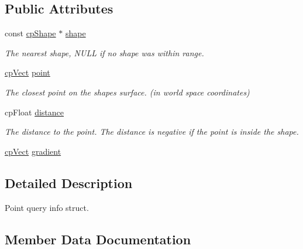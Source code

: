\subsection*{Public Attributes}
\begin{DoxyCompactItemize}
\item 
\mbox{\label{structcpPointQueryInfo_a98fddb05a4044f8a3e6b3da482ed06ed}} 
const \hyperlink{structcpShape}{cp\+Shape} $\ast$ \hyperlink{structcpPointQueryInfo_a98fddb05a4044f8a3e6b3da482ed06ed}{shape}
\begin{DoxyCompactList}\small\item\em The nearest shape, N\+U\+LL if no shape was within range. \end{DoxyCompactList}\item 
\mbox{\label{structcpPointQueryInfo_aa3ba52f53251ad8770c39d7789b14547}} 
\hyperlink{structcpVect}{cp\+Vect} \hyperlink{structcpPointQueryInfo_aa3ba52f53251ad8770c39d7789b14547}{point}
\begin{DoxyCompactList}\small\item\em The closest point on the shape\textquotesingle{}s surface. (in world space coordinates) \end{DoxyCompactList}\item 
\mbox{\label{structcpPointQueryInfo_ab7b002bf19b83cb05dd4635f92884ec8}} 
cp\+Float \hyperlink{structcpPointQueryInfo_ab7b002bf19b83cb05dd4635f92884ec8}{distance}
\begin{DoxyCompactList}\small\item\em The distance to the point. The distance is negative if the point is inside the shape. \end{DoxyCompactList}\item 
\hyperlink{structcpVect}{cp\+Vect} \hyperlink{structcpPointQueryInfo_a55bf2732bc2563af6c83ce1985906034}{gradient}
\end{DoxyCompactItemize}


\subsection{Detailed Description}
Point query info struct. 

\subsection{Member Data Documentation}
\mbox{\label{structcpPointQueryInfo_a55bf2732bc2563af6c83ce1985906034}} 
